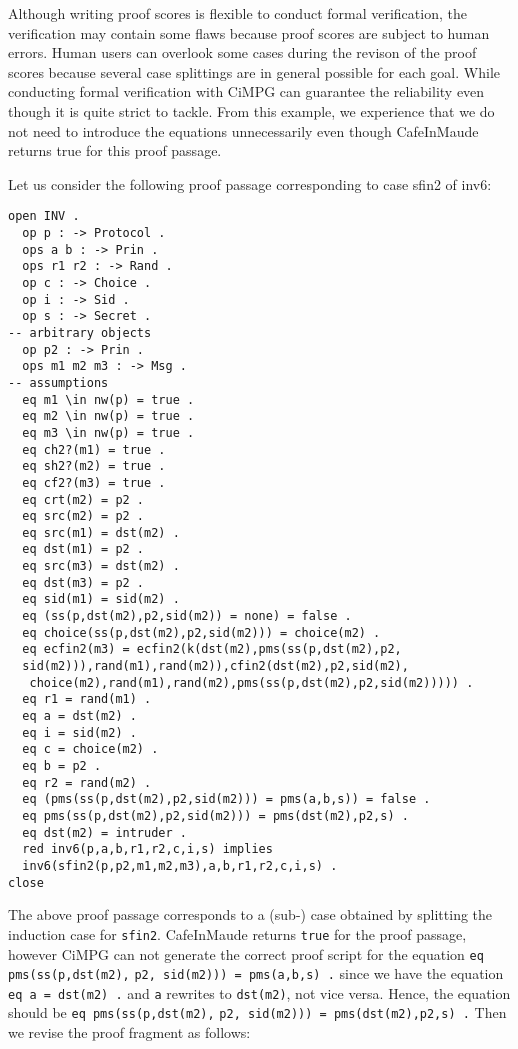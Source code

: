 \documentclass[a4paper,fleqn]{cas-dc}
\begin{document}
Although writing proof scores is flexible to conduct formal verification, the verification may contain some flaws because proof scores are subject to human errors. Human users can overlook some cases during the revison of the proof scores because several case splittings are in general possible for each goal. While conducting formal verification with CiMPG can guarantee the reliability even though it is quite strict to tackle. From this example, we experience that we do not need to introduce the equations unnecessarily even though CafeInMaude returns true for this proof passage. 

Let us consider the following proof passage corresponding to case sfin2 of inv6:
\begin{small}
\begin{verbatim}
open INV .
  op p : -> Protocol .
  ops a b : -> Prin .
  ops r1 r2 : -> Rand .
  op c : -> Choice .
  op i : -> Sid .
  op s : -> Secret .
-- arbitrary objects
  op p2 : -> Prin .
  ops m1 m2 m3 : -> Msg .
-- assumptions
  eq m1 \in nw(p) = true .
  eq m2 \in nw(p) = true .
  eq m3 \in nw(p) = true .
  eq ch2?(m1) = true .
  eq sh2?(m2) = true .
  eq cf2?(m3) = true .
  eq crt(m2) = p2 .
  eq src(m2) = p2 .
  eq src(m1) = dst(m2) .
  eq dst(m1) = p2 .
  eq src(m3) = dst(m2) .
  eq dst(m3) = p2 .
  eq sid(m1) = sid(m2) .
  eq (ss(p,dst(m2),p2,sid(m2)) = none) = false .
  eq choice(ss(p,dst(m2),p2,sid(m2))) = choice(m2) .
  eq ecfin2(m3) = ecfin2(k(dst(m2),pms(ss(p,dst(m2),p2,
  sid(m2))),rand(m1),rand(m2)),cfin2(dst(m2),p2,sid(m2),
   choice(m2),rand(m1),rand(m2),pms(ss(p,dst(m2),p2,sid(m2))))) .
  eq r1 = rand(m1) .
  eq a = dst(m2) .
  eq i = sid(m2) .
  eq c = choice(m2) .
  eq b = p2 .
  eq r2 = rand(m2) .
  eq (pms(ss(p,dst(m2),p2,sid(m2))) = pms(a,b,s)) = false .
  eq pms(ss(p,dst(m2),p2,sid(m2))) = pms(dst(m2),p2,s) .
  eq dst(m2) = intruder .
  red inv6(p,a,b,r1,r2,c,i,s) implies
  inv6(sfin2(p,p2,m1,m2,m3),a,b,r1,r2,c,i,s) .
close
\end{verbatim}
\end{small}
The above proof passage corresponds to a (sub-) case obtained by splitting the induction case for \verb!sfin2!. CafeInMaude returns \verb!true! for the proof passage, however CiMPG can not generate the correct proof script for the equation 
\verb!eq pms(ss(p,dst(m2),! \verb!p2, sid(m2))) = pms(a,b,s) .!
since we have the equation \verb!eq a = dst(m2) .! and \verb!a! rewrites to \verb!dst(m2)!, not vice versa. Hence, the equation should be \verb!eq pms(ss(p,dst(m2),! \verb!p2, sid(m2))) = pms(dst(m2),p2,s) .! Then we revise the proof fragment as follows:
\end{document}
